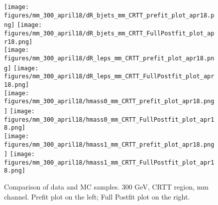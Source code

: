 \begin{figure}[H]
\begin{center}
\texttt{[image: figures/mm\_300\_april18/dR\_bjets\_mm\_CRTT\_prefit\_plot\_apr18.png]}
\texttt{[image: figures/mm\_300\_april18/dR\_bjets\_mm\_CRTT\_FullPostfit\_plot\_apr18.png]}\\
\texttt{[image: figures/mm\_300\_april18/dR\_leps\_mm\_CRTT\_prefit\_plot\_apr18.png]}
\texttt{[image: figures/mm\_300\_april18/dR\_leps\_mm\_CRTT\_FullPostfit\_plot\_apr18.png]}\\
\texttt{[image: figures/mm\_300\_april18/hmass0\_mm\_CRTT\_prefit\_plot\_apr18.png]}
\texttt{[image: figures/mm\_300\_april18/hmass0\_mm\_CRTT\_FullPostfit\_plot\_apr18.png]}\\
\texttt{[image: figures/mm\_300\_april18/hmass1\_mm\_CRTT\_prefit\_plot\_apr18.png]}
\texttt{[image: figures/mm\_300\_april18/hmass1\_mm\_CRTT\_FullPostfit\_plot\_apr18.png]}\\
\caption[Data-MC comparison in CRTT.]{Comparison of data and MC samples. 300 GeV, CRTT region, mm channel. Prefit plot on the left; Full Postfit plot on the right.}
\label{MCcomparisons_mm_low_CRTT}
\end{center}
\end{figure}

